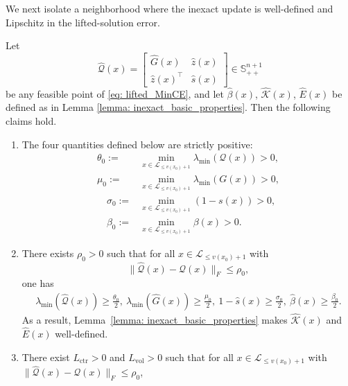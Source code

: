 \documentclass[smallextended]{svjour3}
\newcommand{\K}{\mathcal{K}}
\renewcommand{\S}{\mathbb{S}}
\begin{document}
We next isolate a neighborhood where the inexact update is well-defined and
Lipschitz in the lifted-solution error.
\begin{lemma}\label{lemma: inexact_block_domain_lipschitz}
    Let
    $$
        \widehat{\mathcal{Q}}(x)=\begin{bmatrix}\widehat{G}(x)&\widehat{z}(x)\\\widehat{z}(x)^\top&\widehat{s}(x)\end{bmatrix}\in \S^{n+1}_{++}
    $$
    be any feasible point of \eqref{eq: lifted_MinCE}, and let $\widehat{\beta}(x)$, $\widehat{\K}(x)$, $\widehat{E}(x)$ be defined as in Lemma \ref{lemma: inexact_basic_properties}.
    Then the following claims hold.
    \begin{enumerate}
        \item The four quantities defined below are strictly positive:
        \begin{align*}
            \theta_0 := & \min_{x\in \mathcal{L}_{\leq v(x_0)+1} }
            \lambda_{\min}(\mathcal Q(x))>0,\\
            \mu_0 := & \min_{x\in \mathcal{L}_{\leq v(x_0)+1} }\lambda_{\min}(G(x)) > 0, \\
            \quad
            \sigma_0 := & \min_{x\in \mathcal{L}_{\leq v(x_0)+1} }(1-s(x))> 0 ,\\
            \quad
            \beta_0 := & \min_{x\in \mathcal{L}_{\leq v(x_0)+1} }\beta(x)> 0 .
        \end{align*}
        \item There exists $\rho_0> 0$ such that for all $x\in \mathcal{L}_{\leq v(x_0)+1}$ with
        \begin{equation}\label{eq: inexact_rho0}
            \|\widehat{\mathcal{Q}}(x)-\mathcal{Q}(x)\|_F\le \rho_0,
        \end{equation}
        one has
        \begin{align}\label{eq: inexact_block_domain_bounds}
            \lambda_{\min}(\widehat{\mathcal Q}(x))\ge \frac{\theta_0}{2},~
            \lambda_{\min}(\widehat G(x))\ge \frac{\mu_0}{2},~
            1-\widehat s(x)\ge \frac{\sigma_0}{2},~
            \widehat\beta(x)\ge \frac{\beta_0}{2}.
        \end{align}
        As a result, Lemma~\ref{lemma: inexact_basic_properties} makes
        $\widehat{\K}(x)$ and $\widehat{E}(x)$ well-defined.
        \item There exist $L_{\mathrm{ctr}} >0$ and $L_{\mathrm{vol}}>0$ such that for all $x\in \mathcal{L}_{\leq v(x_0)+1}$ with $\|\widehat{\mathcal{Q}}(x)-\mathcal{Q}(x)\|_F\le \rho_0$,

\end{enumerate}
\end{lemma}
\end{document}
